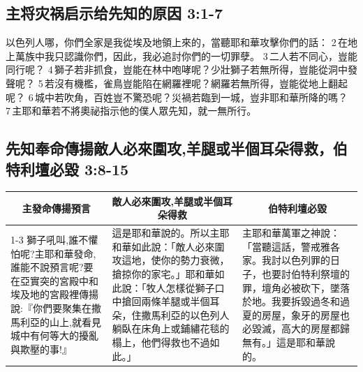 \subsection{主将灾祸启示给先知的原因 3:1-7}
以色列人哪，你們全家是我從埃及地領上來的，當聽耶和華攻擊你們的話： 2 在地上萬族中我只認識你們，因此，我必追討你們的一切罪孽。 3 二人若不同心，豈能同行呢？ 4 獅子若非抓食，豈能在林中咆哮呢？少壯獅子若無所得，豈能從洞中發聲呢？ 5 若沒有機檻，雀鳥豈能陷在網羅裡呢？網羅若無所得，豈能從地上翻起呢？ 6 城中若吹角，百姓豈不驚恐呢？災禍若臨到一城，豈非耶和華所降的嗎？ 7 主耶和華若不將奧祕指示他的僕人眾先知，就一無所行。


\subsection{先知奉命傳揚敵人必來圍攻,羊腿或半個耳朵得救，伯特利壇必毀 3:8-15}
\begin{table}[H]
\centering 
\begin{tabular}{p{13.4em}|p{18.4em}|p{16.2em}}    \toprule 
\multicolumn{1}{c|}{主發命傳揚預言}&\multicolumn{1}{c|}{敵人必來圍攻,羊腿或半個耳朵得救}&\multicolumn{1}{c}{伯特利壇必毀}\\\cline{1-3}
獅子吼叫,誰不懼怕呢?主耶和華發命,誰能不說預言呢?要在亞實突的宮殿中和埃及地的宮殿裡傳揚說:『你們要聚集在撒馬利亞的山上,就看見城中有何等大的擾亂與欺壓的事!』
&這是耶和華說的。所以主耶和華如此說：「敵人必來圍攻這地，使你的勢力衰微，搶掠你的家宅。」耶和華如此說：「牧人怎樣從獅子口中搶回兩條羊腿或半個耳朵，住撒馬利亞的以色列人躺臥在床角上或鋪繡花毯的榻上，他們得救也不過如此。」
&主耶和華萬軍之神說：「當聽這話，警戒雅各家。我討以色列罪的日子，也要討伯特利祭壇的罪，壇角必被砍下，墜落於地。我要拆毀過冬和過夏的房屋，象牙的房屋也必毀滅，高大的房屋都歸無有。」這是耶和華說的。\\ \bottomrule
\end{tabular} 
\end{table}


